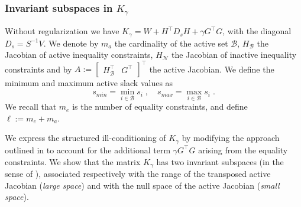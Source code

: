 \documentclass[smallextended]{svjour3}
\newcommand{\cactive}{\mathcal{B}}
\newcommand{\cinactive}{\mathcal{N}}
\begin{document}
\subsubsection{Invariant subspaces in $K_\gamma$}
Without regularization we have $K_\gamma = W + H^\top D_s H + \gamma G^\top G$, with
the diagonal $D_s = S^{-1} V$.
We denote by $m_a$ the cardinality of the active set $\mathcal{B}$,
$H_{\cactive}$ the Jacobian of active inequality constraints, $H_{\cinactive}$ the
Jacobian of inactive inequality constraints and by
$A := \begin{bmatrix} H_{\cactive}^\top & G^\top \end{bmatrix}^\top$ the active Jacobian.
We define the minimum and maximum active slack values as
\begin{equation}
  s_{min} = \min_{i \in \cactive} s_i \; , \quad
  s_{max} = \max_{i \in \cactive} s_i \; .
\end{equation}
We recall that $m_e$ is the number of equality constraints,
and define $\ell := m_e + m_a$.

We express the structured ill-conditioning of $K_\gamma$ by
modifying the approach outlined in \cite[Theorem 3.2]{wright1998ill} to account for the additional
term $\gamma G^\top G$ arising from the equality constraints.
We show that the matrix $K_\gamma$ has two invariant subspaces
(in the sense of \cite[Chapter 5]{stewart1990matrix}),
associated respectively with the range of the transposed active Jacobian
(\emph{large space}) and with the null space of the active Jacobian (\emph{small space}).
\end{document}
